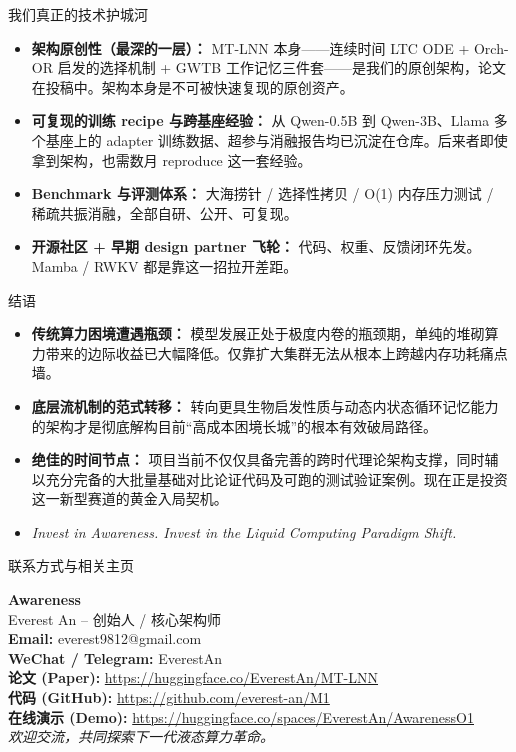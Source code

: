﻿\documentclass[aspectratio=169, 10pt]{beamer}
\begin{document}
\begin{frame}{我们真正的技术护城河}
\small
\begin{itemize}\itemsep=0.5em
    \item \textbf{架构原创性（最深的一层）：} MT-LNN 本身——连续时间 LTC ODE + Orch-OR 启发的选择机制 + GWTB 工作记忆三件套——是我们的原创架构，论文在投稿中。架构本身是不可被快速复现的原创资产。
    \item \textbf{可复现的训练 recipe 与跨基座经验：} 从 Qwen-0.5B 到 Qwen-3B、Llama 多个基座上的 adapter 训练数据、超参与消融报告均已沉淀在仓库。后来者即使拿到架构，也需数月 reproduce 这一套经验。
    \item \textbf{Benchmark 与评测体系：} 大海捞针 / 选择性拷贝 / O(1) 内存压力测试 / 稀疏共振消融，全部自研、公开、可复现。
    \item \textbf{开源社区 + 早期 design partner 飞轮：} 代码、权重、反馈闭环先发。Mamba / RWKV 都是靠这一招拉开差距。
\end{itemize}
\end{frame}

\begin{frame}{结语}
\begin{itemize}
    \item \textbf{传统算力困境遭遇瓶颈：} 模型发展正处于极度内卷的瓶颈期，单纯的堆砌算力带来的边际收益已大幅降低。仅靠扩大集群无法从根本上跨越内存功耗痛点墙。
    \item \textbf{底层流机制的范式转移：} 转向更具生物启发性质与动态内状态循环记忆能力的架构才是彻底解构目前“高成本困境长城”的根本有效破局路径。
    \item \textbf{绝佳的时间节点：} 项目当前不仅仅具备完善的跨时代理论架构支撑，同时辅以充分完备的大批量基础对比论证代码及可跑的测试验证案例。现在正是投资这一新型赛道的黄金入局契机。
    \vspace{0.5em}
    \item \textit{Invest in Awareness. Invest in the Liquid Computing Paradigm Shift.}
\end{itemize}
\end{frame}

\begin{frame}{联系方式与相关主页}
\begin{center}
    \LARGE \textbf{Awareness} \\
    \vspace{0.5em}
    \large Everest An -- 创始人 / 核心架构师 \\
    \vspace{1.5em}
    \normalsize
    \textbf{Email:} everest9812@gmail.com \\
    \textbf{WeChat / Telegram:} EverestAn \\
    \vspace{1.5em}
    \small
    \textbf{论文 (Paper):} \url{https://huggingface.co/EverestAn/MT-LNN} \\
    \textbf{代码 (GitHub):} \url{https://github.com/everest-an/M1} \\
    \textbf{在线演示 (Demo):} \url{https://huggingface.co/spaces/EverestAn/AwarenessO1} \\
    \vspace{1.5em}
    \textit{欢迎交流，共同探索下一代液态算力革命。}
\end{center}
\end{frame}
\end{document}
